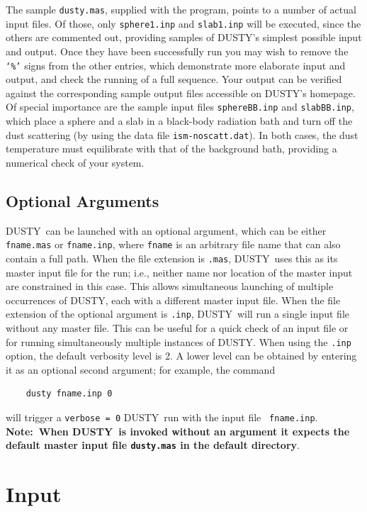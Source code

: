 \documentclass[11pt]{article}
\def\D    {{\sf DUSTY}}
\begin{document}
The sample {\tt dusty.mas}, supplied with the program, points to a
number of actual input files. Of those, only {\tt sphere1.inp} and
{\tt slab1.inp} will be executed, since the others are commented out,
providing samples of \D's simplest possible input and output. Once
they have been successfully run you may wish to remove the {\tt `\%'}
signs from the other entries, which demonstrate more elaborate input
and output, and check the running of a full sequence. Your output can
be verified against the corresponding sample output files accessible
on \D's homepage. Of special importance are the sample input files
{\tt sphereBB.inp} and {\tt slabBB.inp}, which place a sphere and a
slab in a black-body radiation bath and turn off the dust scattering
(by using the data file {\tt ism-noscatt.dat}). In both cases, the
dust temperature must equilibrate with that of the background bath,
providing a numerical check of your system.

\subsection{Optional Arguments}

\D\ can be launched with an optional argument, which can be either
{\tt fname.mas} or {\tt fname.inp}, where {\tt fname} is an arbitrary
file name that can also contain a full path. When the file extension
is {\tt .mas}, \D\ uses this as its master input file for the run;
i.e., neither name nor location of the master input are constrained in
this case. This allows simultaneous launching of multiple occurrences
of \D, each with a different master input file. When the file
extension of the optional argument is {\tt .inp}, \D\ will run a
single input file without any master file. This can be useful for a
quick check of an input file or for running simultaneously multiple
instances of \D. When using the {\tt .inp} option, the default
verbosity level is 2. A lower level can be obtained by entering it as
an optional second argument; for example, the command
\begin{verbatim}
    dusty fname.inp 0
\end{verbatim}
will trigger a {\tt verbose = 0} \D\ run with the input file {\tt
  fname.inp}.  {\bf Note:\ When \D\ is invoked without an argument it
  expects the default master input file {\tt dusty.mas} in the default
  directory}.


\section{Input}
\label{sec:input}
\end{document}

